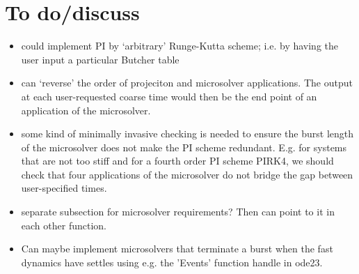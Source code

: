 \section{To do/discuss}
\begin{itemize}
\item could implement PI by `arbitrary' Runge-Kutta scheme; i.e. by having the user input a particular Butcher table
\item can `reverse' the order of projeciton and microsolver applications. The output at each user-requested coarse time would then be the end point of an application of the microsolver.
\item some kind of minimally invasive checking is needed to ensure the burst length of the microsolver does not make the PI scheme redundant. E.g. for systems that are not too stiff and for a fourth order PI scheme PIRK4, we should check that four applications of the microsolver do not bridge the gap between user-specified times.
\item separate subsection for microsolver requirements? Then can point to it in each other function.
\item Can maybe implement microsolvers that terminate a burst when the fast dynamics have settles using e.g. the 'Events' function handle in ode23. 
\end{itemize}


